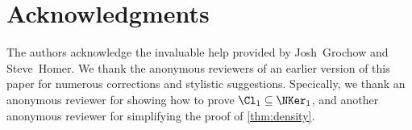 \section{Acknowledgments}

The authors acknowledge the invaluable help provided by Josh~Grochow and Steve~Homer.
We thank the anonymous reviewers of an earlier version of this paper for numerous corrections and stylistic suggestions.
Specically, we thank an anonymous reviewer for showing how to prove $\Cl_1 \subseteq \NKer_1$, and another anonymous reviewer for simplifying the proof of \autoref{thm:density}.
